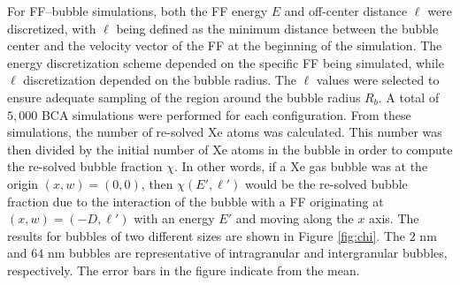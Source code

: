 \documentclass[review]{elsarticle}
\providecommand{\DIFadd}[1]{{\bf #1}} %
\providecommand{\DIFdel}[1]{} %
\providecommand{\DIFaddbegin}{\protect\color{blue}} %
\providecommand{\DIFaddend}{\protect\color{black}} %
\providecommand{\DIFdelbegin}{\protect\color{red}} %
\providecommand{\DIFdelend}{\protect\color{black}} %
\newcommand{\DIFscaledelfig}{0.5}
\newlength{\DIFdelgraphicswidth} %
\newlength{\DIFdelgraphicsheight} %
\newcommand{\DIFaddincludegraphics}[2][]{{\color{blue}\fbox{\DIFOincludegraphics[#1]{#2}}}} %
\newcommand{\DIFdelincludegraphics}[2][]{%
\sbox{\DIFdelgraphicsbox}{\DIFOincludegraphics[#1]{#2}}%
\settoboxwidth{\DIFdelgraphicswidth}{\DIFdelgraphicsbox} %
\settoboxtotalheight{\DIFdelgraphicsheight}{\DIFdelgraphicsbox} %
\scalebox{\DIFscaledelfig}{%
\parbox[b]{\DIFdelgraphicswidth}{\usebox{\DIFdelgraphicsbox}\\[-\baselineskip] \rule{\DIFdelgraphicswidth}{0em}}\llap{\resizebox{\DIFdelgraphicswidth}{\DIFdelgraphicsheight}{%
\setlength{\unitlength}{\DIFdelgraphicswidth}%
\begin{picture}(1,1)%
\thicklines\linethickness{2pt} %
{\color[rgb]{1,0,0}\put(0,0){\framebox(1,1){}}}%
{\color[rgb]{1,0,0}\put(0,0){\line( 1,1){1}}}%
{\color[rgb]{1,0,0}\put(0,1){\line(1,-1){1}}}%
\end{picture}%
}\hspace*{3pt}}} %
} %
\DeclareRobustCommand{\DIFaddbegin}{\DIFOaddbegin \let\includegraphics\DIFaddincludegraphics} %
\DeclareRobustCommand{\DIFaddend}{\DIFOaddend \let\includegraphics\DIFOincludegraphics} %
\DeclareRobustCommand{\DIFdelbegin}{\DIFOdelbegin \let\includegraphics\DIFdelincludegraphics} %
\DeclareRobustCommand{\DIFdelend}{\DIFOaddend \let\includegraphics\DIFOincludegraphics} %
\begin{document}
For FF--bubble simulations, both the FF energy $E$ and off-center distance $\ell$ were discretized, with $\ell$ being defined as the minimum distance between the bubble center and the velocity vector of the FF at the beginning of the simulation. The energy discretization scheme depended on the specific FF being simulated, while $\ell$ discretization depended on the bubble radius. The $\ell$ values were selected to ensure adequate sampling of the region around the bubble radius $R_b$. A total of $5,000$ BCA simulations were performed for each configuration. From these simulations, the number of re-solved Xe atoms was calculated. This number was then divided by the initial number of Xe atoms in the bubble in order to compute the re-solved bubble fraction $\chi$. In other words, if a Xe gas bubble was at the origin $(x, w) = (0, 0)$, then $\chi(E', \ell')$ would be the re-solved bubble fraction due to the interaction of the bubble with a FF originating at $(x, w) = (-D, \ell')$ with an energy $E'$ and moving along the $x$ axis. The results for bubbles of two different sizes are shown in Figure \ref{fig:chi}. The $2$ nm and $64$ nm bubbles are representative of intragranular and intergranular bubbles, respectively. The error bars in the figure indicate \DIFdelbegin \DIFdel{$2\sigma$ deviations }\DIFdelend \DIFaddbegin \DIFadd{$2 \sigma$ deviation }\DIFaddend from the mean. \DIFaddbegin \DIFadd{For $2$ nm bubbles, the noticeably large error bars stem from the small cross section of FF--bubble interactions and the consequent statistical fluctuations from Monte Carlo methods. While performing the simulations, $\chi$ was computed after every $1,000$ runs. The relative change in $\chi$ over the final $1,000$ runs was at most $0.2$ for the smallest bubbles, which was deemed sufficient for convergence.
}\DIFaddend 
\end{document}
